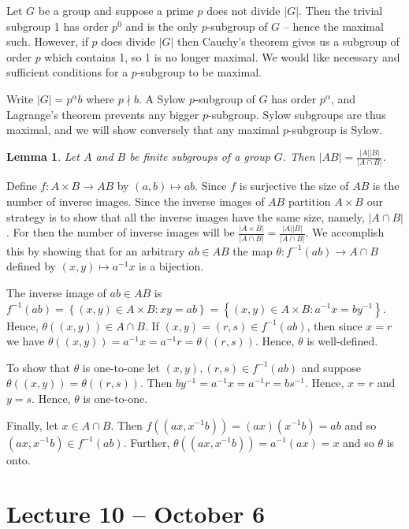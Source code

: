 \documentclass[letterpaper]{article}
\newtheorem{lemma}[theorem]{Lemma}
\newenvironment{proof}[1][Proof]{\begin{trivlist}
\item[\hskip \labelsep {\bfseries #1}]}{\end{trivlist}}
\begin{document}
Let $G$ be a group and suppose a prime $p$ does not divide $|G|$. Then the trivial subgroup 1 has order $p^0$ and is the only $p$-subgroup of $G$ -- hence the maximal such. However, if $p$ does divide $|G|$ then Cauchy's theorem gives us a subgroup of order $p$ which contains 1, so 1 is no longer maximal. We would like necessary and sufficient conditions for a $p$-subgroup to be maximal.

Write $|G| = p^\alpha b$ where $p \nmid b$. A Sylow $p$-subgroup of $G$ has order $p^\alpha$, and Lagrange's theorem prevents any bigger $p$-subgroup. Sylow subgroups are thus maximal, and we will show conversely that any maximal $p$-subgroup is Sylow.

\begin{lemma}
Let $A$ and $B$ be finite subgroups of a group $G$. Then $|AB|= \frac{|A||B|}{|A \cap B|}$.
\end{lemma}
\begin{proof}
Define $f \colon A \times B \rightarrow AB$ by $(a,b) \mapsto ab$. Since $f$ is surjective the size of $AB$ is the number of inverse images. Since the inverse images of $AB$ partition $A \times B$ our strategy is to show that all the inverse images have the same size, namely, $|A \cap B|$. For then the number of inverse images will be $\frac{|A \times B|}{|A \cap B|}=\frac{|A||B|}{|A \cap B|}$. We accomplish this by showing that for an arbitrary $ab \in AB$ the map $\theta \colon f^{-1}(ab) \rightarrow A \cap B$ defined by $(x,y) \mapsto a^{-1}x$ is a bijection.

The inverse image of $ab \in AB$ is $f^{-1}(ab)=\left\{(x,y) \in A \times B \colon xy=ab\right\}=\left\{(x,y) \in A \times B \colon a^{-1}x=by^{-1}\right\}$. Hence, $\theta ((x,y)) \in A \cap B$. If $(x,y)=(r,s) \in f^{-1}(ab)$, then since $x=r$ we have $\theta((x,y))=a^{-1}x=a^{-1}r=\theta((r,s))$. Hence, $\theta$ is well-defined.

To show that $\theta$ is one-to-one let $(x,y),(r,s) \in f^{-1}(ab)$ and suppose $\theta((x,y))=\theta((r,s))$. Then $by^{-1}=a^{-1}x=a^{-1}r=bs^{-1}$. Hence, $x=r$ and $y=s$. Hence, $\theta$ is one-to-one.

Finally, let $x \in A \cap B$.  Then $f((ax,x^{-1}b))=(ax)(x^{-1}b)=ab$ and so $(ax,x^{-1}b) \in f^{-1}(ab)$. Further, $\theta((ax,x^{-1}b))=a^{-1}(ax)=x$ and so $\theta$ is onto.

\end{proof}

\section{Lecture 10 -- October 6}
\end{document}
